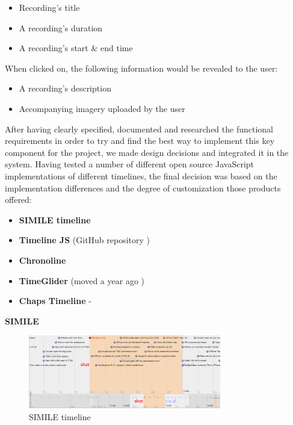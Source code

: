 \documentclass{l3proj}
\begin{document}
\begin{itemize}
\item{Recording's title}
\item{A recording's duration}
\item{A recording's start & end time}
\end{itemize}

When clicked on, the following information would be revealed to the user:
\begin{itemize}
\item{A recording's description}
\item{Accompanying imagery uploaded by the user}
\end{itemize}

After having clearly specified, documented and researched the functional requirements in order to try and find the best way to implement this key component for the project, we made design decisions and integrated it in the system. Having tested a number of different open source JavaScript implementations of different timelines, the final decision was based on the implementation differences and the degree of customization those products offered:


\begin{itemize}


\item{\textbf{SIMILE timeline} \cite{SIMILE}}

\item{\textbf{Timeline JS} \cite{TimelineJS} (GitHub repository \cite{TimelineJSGithub})}

\item{\textbf{Chronoline} \cite{Chronoline}}

\item{\textbf{TimeGlider} \cite{TimegliderGithub} (moved a year ago \cite{Timeglider})}

\item{\textbf{Chaps Timeline} - \cite{Chaps}}


\end{itemize}


\textbf{SIMILE}

\begin{figure}[ht!]
  \centering
\includegraphics[width=0.75\textwidth]{images/SIMILE.png}
\caption{SIMILE timeline}
\end{figure}
\end{document}
